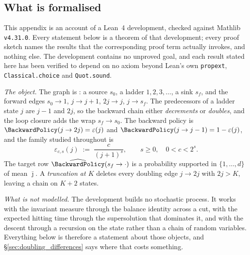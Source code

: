 \section{\appendixHtitle}\label{app:doubling}

\subsection{What is formalised}\label{sec:doubling_formal}

This appendix is an account of a Lean~4 development, checked against Mathlib
\texttt{v4.31.0}. Every statement below is a theorem of that development; every proof sketch
names the results that the corresponding proof term actually invokes, and nothing else. The
development contains no unproved goal, and each result stated here has been verified to depend
on no axiom beyond Lean's own \texttt{propext}, \texttt{Classical.choice} and
\texttt{Quot.sound}.

\medskip\noindent
\emph{The object.} The graph is : a source
$s_0$, a ladder $1,2,3,\dots$, a sink $s_f$, and the forward edges $s_0\rightarrow1$,
$j\rightarrow j+1$, $2j\rightarrow j$, $j\rightarrow s_f$. The predecessors of a ladder state
$j$ are $j-1$ and $2j$, so the backward chain either \emph{decrements} or \emph{doubles}, and
the loop closure adds the wrap $s_f\rightarrow s_0$. The backward policy is
$\BackwardPolicy(j\rightarrow2j)=\varepsilon(j)$ and
$\BackwardPolicy(j\rightarrow j-1)=1-\varepsilon(j)$, and the family studied throughout is
\begin{equation}\label{eq:doubling_family}
    \varepsilon_{c,s}(j)\;:=\;\frac{c}{(j+1)^{s}},\qquad s\geq0,\quad 0<c<2^{s} .
\end{equation}
The target row $\widehat\BackwardPolicy(s_f\rightarrow\cdot)$ is a probability supported in
$\{1,\dots,d\}$ of mean $\bar\jmath$. A \emph{truncation at $K$} deletes every doubling edge
$j\rightarrow2j$ with $2j>K$, leaving a chain on $K+2$ states.

\medskip\noindent
\emph{What is not modelled.} The development builds no stochastic process. It works with the
invariant measure through the balance identity across a cut, with the expected hitting time
through the supersolution that dominates it, and with the descent through a recursion on the
state rather than a chain of random variables. Everything below is therefore a statement about
those objects, and \S\ref{sec:doubling_differences} says where that costs something.


